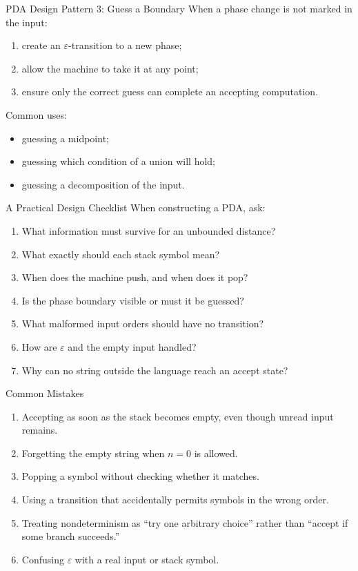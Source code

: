 \documentclass[aspectratio=169,10pt]{beamer}
\newcommand{\eps}{\varepsilon}
\begin{document}
\begin{frame}{PDA Design Pattern 3: Guess a Boundary}
When a phase change is not marked in the input:

\begin{enumerate}
    \item create an $\eps$-transition to a new phase;
    \item allow the machine to take it at any point;
    \item ensure only the correct guess can complete an accepting computation.
\end{enumerate}

\vspace{0.8em}
Common uses:
\begin{itemize}
    \item guessing a midpoint;
    \item guessing which condition of a union will hold;
    \item guessing a decomposition of the input.
\end{itemize}
\end{frame}

\begin{frame}{A Practical Design Checklist}
When constructing a PDA, ask:

\begin{enumerate}
    \item What information must survive for an unbounded distance?
    \item What exactly should each stack symbol mean?
    \item When does the machine push, and when does it pop?
    \item Is the phase boundary visible or must it be guessed?
    \item What malformed input orders should have no transition?
    \item How are $\eps$ and the empty input handled?
    \item Why can no string outside the language reach an accept state?
\end{enumerate}
\end{frame}

\begin{frame}{Common Mistakes}
\begin{enumerate}
    \item Accepting as soon as the stack becomes empty, even though unread input remains.
    \item Forgetting the empty string when $n=0$ is allowed.
    \item Popping a symbol without checking whether it matches.
    \item Using a transition that accidentally permits symbols in the wrong order.
    \item Treating nondeterminism as ``try one arbitrary choice'' rather than ``accept if some branch succeeds.''
    \item Confusing $\eps$ with a real input or stack symbol.
\end{enumerate}
\end{frame}
\end{document}
